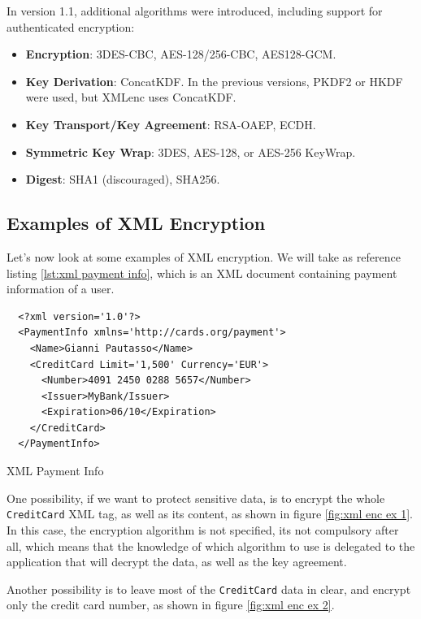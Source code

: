 In version 1.1, additional algorithms were introduced, including support for authenticated encryption:

\begin{itemize}
    \item \textbf{Encryption}: 3DES-CBC, AES-128/256-CBC, AES128-GCM.
    \item \textbf{Key Derivation}: ConcatKDF. In the previous versions, PKDF2 or HKDF were used, but XMLenc uses ConcatKDF.
    \item \textbf{Key Transport/Key Agreement}: RSA-OAEP, ECDH.
    \item \textbf{Symmetric Key Wrap}: 3DES, AES-128, or AES-256 KeyWrap.
    \item \textbf{Digest}: SHA1 (discouraged), SHA256.
\end{itemize}

\subsection{Examples of XML Encryption}
Let's now look at some examples of XML encryption. We will take as
reference listing \ref{lst:xml payment info}, which is an XML document 
containing payment information of a user.

\begin{listing}[H]
  \centering
  \begin{verbatim}
  <?xml version='1.0'?>
  <PaymentInfo xmlns='http://cards.org/payment'>
    <Name>Gianni Pautasso</Name>
    <CreditCard Limit='1,500' Currency='EUR'>
      <Number>4091 2450 0288 5657</Number>
      <Issuer>MyBank/Issuer>
      <Expiration>06/10</Expiration>
    </CreditCard>
  </PaymentInfo>
  \end{verbatim}
  \caption{XML Payment Info}
  \label{lst:xml payment info}
\end{listing}

One possibility, if we want to protect sensitive data, is to encrypt
the whole \texttt{CreditCard} XML tag, as well as its content, as
shown in figure \ref{fig:xml enc ex 1}. In this case, the encryption
algorithm is not specified, its not compulsory after all, which means
that the knowledge of which algorithm to use is delegated to the 
application that will decrypt the data, as well as the key agreement.

Another possibility is to leave most of the \texttt{CreditCard} data
in clear, and encrypt only the credit card number, as shown in figure
\ref{fig:xml enc ex 2}. 

